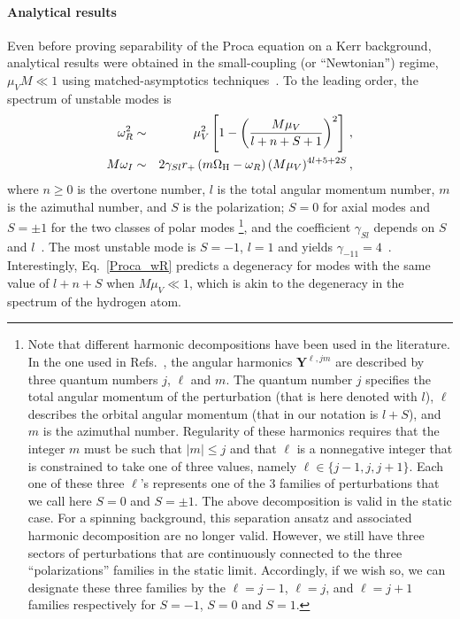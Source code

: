 \documentclass[11pt]{article}
\numberwithin{equation}{section} %
\begin{document}
\paragraph{Analytical results}
Even before proving separability of the Proca equation on a Kerr background, analytical results were obtained in the 
small-coupling (or ``Newtonian'') regime, $\mu_V M\ll1$ using matched-asymptotics 
techniques~\cite{Endlich:2016jgc,Baryakhtar:2017ngi,Baumann:2019eav}. To the leading order, the spectrum of unstable 
modes is
\begin{eqnarray}
 \omega_R^2 &\sim& \mu_V^2\left[1-\left(\frac{M\mu_V}{l+n+S+1}\right)^2\right]\,,\label{Proca_wR}\\
 M\omega_I  &\sim& 2\gamma_{Sl}r_+\left(m\Omega_{\rm H}-\omega_R \right) (M\mu_V)^{4l+5+2S}\,,\label{Proca_wI}
\end{eqnarray}
where $n\geq0$ is the overtone number, $l$ is the total angular momentum number, $m$ is the azimuthal number, and $S$ 
is the polarization; $S=0$ for axial modes and $S=\pm1$ for the two 
classes of polar modes
\footnote{\label{foot:notation}
Note that different harmonic decompositions have been used in the literature. In the one 
used in Refs.~\cite{Endlich:2016jgc,Baryakhtar:2017ngi}, the angular harmonics $\bm{Y}^{\ell,jm}$ are described by 
three quantum 
numbers $j$, $\ell$ and $m$. The quantum number $j$ specifies the total angular momentum of the perturbation (that is here denoted with $l$), $\ell$ describes the orbital angular momentum (that in our notation is $l+S$), and $m$ is the azimuthal number. Regularity of these harmonics requires that the integer $m$ must be such that $|m| \leq j$ and that $\ell$ is a nonnegative integer that is constrained to take one of three values, namely $\ell \in\{j - 1, j, j + 1\}$. Each one of these three $\ell$'s represents one of the $3$ families of perturbations that we call here $S=0$ and $S=\pm1$. The above decomposition is valid in the static case. For a spinning background, this separation ansatz and associated harmonic decomposition are no longer valid. However, we still have three sectors of perturbations that are continuously
connected to the three ``polarizations'' families in the static limit. Accordingly, if we wish so, we can designate
these three families by the $\ell = j - 1$, $\ell = j$, and $\ell = j + 1$ families respectively for $S=-1$, $S=0$ and $S=1$.}, and the 
coefficient $\gamma_{Sl}$ depends on $S$ and 
$l$~\cite{Baryakhtar:2017ngi,Baumann:2019eav}. The most unstable mode is $S=-1$, $l=1$ and yields 
$\gamma_{-11}=4$~\cite{Baryakhtar:2017ngi}. Interestingly, Eq.~\eqref{Proca_wR} predicts a degeneracy for modes with 
the same value of $l+n+S$ when $M\mu_V\ll 1$, which is akin to the degeneracy in the spectrum of the hydrogen atom. 
\end{document}
